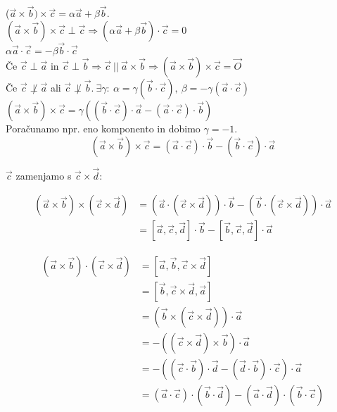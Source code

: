 \documentclass[a4paper,12pt]{article}
\begin{document}
($\vec{a}\times \vec{b})\times \vec{c}=\alpha \vec{a} + \beta \vec{b}$. \\

$(\vec{a}\times \vec{b})\times \vec{c} \perp \vec{c} \Rightarrow (\alpha \vec{a}+\beta \vec{b})\cdot \vec{c} = 0$ \\

$\alpha \vec{a}\cdot \vec{c}=-\beta \vec{b}\cdot \vec{c} $ \\

Če $\vec{c}\perp \vec{a}$ in $\vec{c}\perp \vec{b} \Rightarrow \vec{c} ~ || ~ \vec{a}\times \vec{b} \Rightarrow (\vec{a}\times \vec{b})\times \vec{c}=\vec{O}$ \\

Če $\vec{c} \not \perp \vec{a}$ ali $\vec{c} \not \perp \vec{b}.~ \exists \gamma:~\alpha=\gamma(\vec{b}\cdot \vec{c}),~\beta=-\gamma(\vec{a}\cdot \vec{c})$ \\

$(\vec{a}\times \vec{b})\times\vec{c}=\gamma((\vec{b}\cdot \vec{c})\cdot \vec{a}-(\vec{a}\cdot \vec{c})\cdot \vec{b})$ \\

Poračunamo npr. eno komponento in dobimo $\gamma=-1$. \\

$$ (\vec{a} \times \vec{b})\times \vec{c}=(\vec{a}\cdot \vec{c})\cdot \vec{b}-(\vec{b}\cdot \vec{c})\cdot \vec{a} $$

$\vec{c}$ zamenjamo s $\vec{c}\times \vec{d}$: 

\begin{align*}
	(\vec{a}\times \vec{b})\times(\vec{c}\times \vec{d}) &= (\vec{a}\cdot (\vec{c}\times \vec{d}))\cdot \vec{b} - (\vec{b}\cdot (\vec{c}\times \vec{d}))\cdot \vec{a} \\
	&= [\vec{a},\vec{c},\vec{d}]\cdot \vec{b}-[\vec{b},\vec{c},\vec{d}]\cdot \vec{a}
\end{align*}

\begin{align*}
	(\vec{a}\times\vec{b})\cdot (\vec{c}\times \vec{d}) &= [\vec{a},\vec{b},\vec{c}\times \vec{d}] \\
	&= [\vec{b},\vec{c}\times \vec{d},\vec{a}] \\
	&= (\vec{b}\times(\vec{c}\times \vec{d}))\cdot \vec{a} \\
	&= -((\vec{c}\times \vec{d})\times \vec{b})\cdot \vec{a} \\
	&= -((\vec{c}\cdot\vec{b})\cdot \vec{d}-(\vec{d}\cdot \vec{b})\cdot \vec{c})\cdot \vec{a}  \\
	&= (\vec{a}\cdot \vec{c})\cdot (\vec{b}\cdot \vec{d})-(\vec{a}\cdot \vec{d})\cdot (\vec{b}\cdot \vec{c})
\end{align*}
\end{document}
